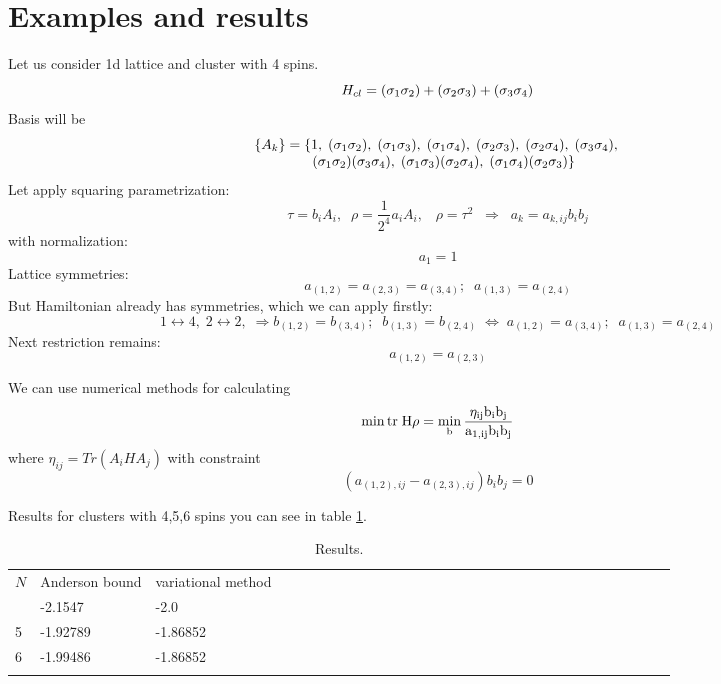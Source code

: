 \documentclass[a4paper]{jpconf}
\renewcommand\[{\begin{equation}}
\renewcommand\]{\end{equation}}
\begin{document}
\section{Examples and results}
Let us consider 1d lattice and cluster with 4 spins.
\[{H_{cl}} = ({{\bf{\sigma }}_1}{{\bf{\sigma }}_2}) + ({{\bf{\sigma }}_2}{{\bf{\sigma }}_3}) + ({{\bf{\sigma }}_3}{{\bf{\sigma }}_4})\]
Basis will be
\[\begin{array}{l}
\{ {A_k}\}  = \{ 1,\;({{\bf{\sigma }}_1}{{\bf{\sigma }}_2}),\;({{\bf{\sigma }}_1}{{\bf{\sigma }}_3}),\;({{\bf{\sigma }}_1}{{\bf{\sigma }}_4}),\;({{\bf{\sigma }}_2}{{\bf{\sigma }}_3}),\;({{\bf{\sigma }}_2}{{\bf{\sigma }}_4}),\;({{\bf{\sigma }}_3}{{\bf{\sigma }}_4}),\;\\
\;\;\;\;\;\;\;\;\;\;\;\;\;\;\;({{\bf{\sigma }}_1}{{\bf{\sigma }}_2})({{\bf{\sigma }}_3}{{\bf{\sigma }}_4}),\;({{\bf{\sigma }}_1}{{\bf{\sigma }}_3})({{\bf{\sigma }}_2}{{\bf{\sigma }}_4}),\;({{\bf{\sigma }}_1}{{\bf{\sigma }}_4})({{\bf{\sigma }}_2}{{\bf{\sigma }}_3})\} 
\end{array}\]
Let apply squaring parametrization:
\[\tau  = {b_i}{A_i},\;\;\rho  = \frac{1}{{{2^4}}}{a_i}{A_i},\;\;\;\rho  = {\tau ^2}\;\; \Rightarrow \;\;{a_k} = {a_{k,ij}}{b_i}{b_j}\]
with normalization:
\[{a_1} = 1\]
Lattice symmetries:
\[{a_{(1,2)}} = {a_{(2,3)}} = {a_{(3,4)}};\;\;{a_{(1,3)}} = {a_{(2,4)}}\]
But Hamiltonian already has symmetries, which we can apply firstly:
\[1\leftrightarrow 4, \;2\leftrightarrow 2, \;\Rightarrow 
{b_{(1,2)}} = {b_{(3,4)}};\;\;{b_{(1,3)}} = {b_{(2,4)}}\;\Leftrightarrow\;
{a_{(1,2)}} = {a_{(3,4)}};\;\;{a_{(1,3)}} = {a_{(2,4)}}
\]
Next restriction remains:
\[a_{(1,2)}=a_{(2,3)}\]

We can use numerical methods for calculating 
\[\mathop {\min } \rm{tr}\;H\rho  = \mathop {\min }\limits_b \frac{{\eta _{ij}}{b_i}{b_j}}{{{\rm{a}}_{1,ij}}{b_i}{b_j}}\]
where ${\eta _{ij}} = Tr({A_i}H{A_j})$
with constraint
\[({a_{(1,2),ij}} - {a_{(2,3),ij}}){b_i}{b_j}=0\]

Results for clusters with 4,5,6 spins you can see in table \ref{result}.


\begin{table}
	\caption{\label{result}Results.}
	\begin{center}
		\begin{tabular}{lllllllllllllllllllllllllllllll}
			\br
			$N$&Anderson bound&variational method\\
			\mr
			4 &-2.1547  & -2.0\\
			5 &-1.92789 & -1.86852\\
			6 &-1.99486 & -1.86852\\
			\br
		\end{tabular}
	\end{center}
\end{table}
\end{document}
